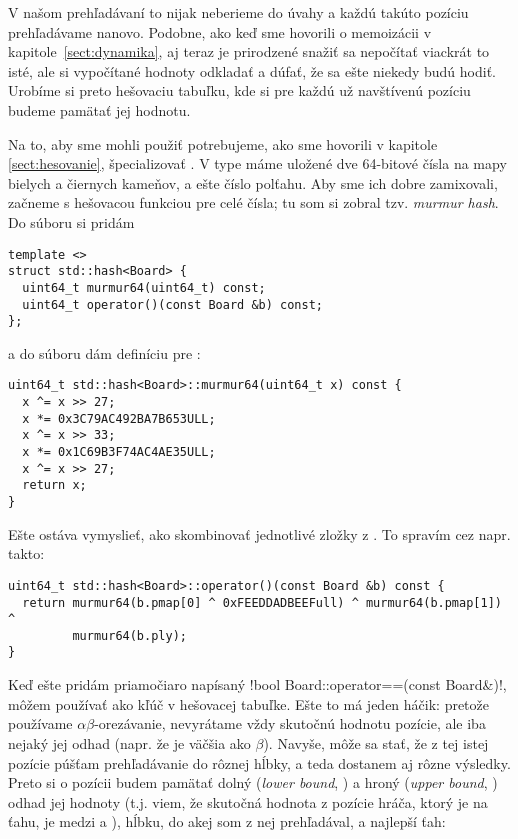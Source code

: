 V našom prehľadávaní to nijak neberieme do úvahy a každú
takúto pozíciu prehľadávame nanovo.
Podobne, ako keď sme hovorili o memoizácii v kapitole~\ref{sect:dynamika}, aj teraz je prirodzené
snažiť sa nepočítať viackrát to isté, ale si vypočítané hodnoty odkladať a dúfať, že sa ešte niekedy budú hodiť.
Urobíme si preto hešovaciu tabuľku, kde si pre každú už navštívenú pozíciu budeme pamätať jej hodnotu.

Na to, aby sme mohli použiť  potrebujeme, ako sme hovorili v kapitole \ref{sect:hesovanie}, špecializovať
. V type  máme uložené dve 64-bitové čísla na mapy bielych a čiernych kameňov, a ešte číslo polťahu.
Aby sme ich dobre zamixovali, začneme s hešovacou funkciou pre celé čísla; tu som si zobral tzv. {\em murmur hash}. Do súboru
 si pridám\\

\begin{lstlisting}
template <>
struct std::hash<Board> {
  uint64_t murmur64(uint64_t) const;
  uint64_t operator()(const Board &b) const;
};
\end{lstlisting}

a do súboru  dám definíciu pre :\\

\begin{lstlisting}
uint64_t std::hash<Board>::murmur64(uint64_t x) const {
  x ^= x >> 27;
  x *= 0x3C79AC492BA7B653ULL;
  x ^= x >> 33;
  x *= 0x1C69B3F74AC4AE35ULL;
  x ^= x >> 27;
  return x;
}
\end{lstlisting}

Ešte ostáva vymyslieť, ako skombinovať jednotlivé zložky z . To spravím cez  napr. takto:

\begin{lstlisting}
uint64_t std::hash<Board>::operator()(const Board &b) const {
  return murmur64(b.pmap[0] ^ 0xFEEDDADBEEFull) ^ murmur64(b.pmap[1]) ^
         murmur64(b.ply);
}
\end{lstlisting}

Keď ešte pridám priamočiaro napísaný \prg!bool Board::operator==(const Board&)!, môžem  používať ako kľúč v hešovacej tabuľke. 
Ešte to má jeden háčik: pretože používame $\alpha\beta$-orezávanie, nevyrátame vždy skutočnú hodnotu pozície, ale iba nejaký jej odhad (napr.
že je väčšia ako $\beta$). Navyše, môže sa stať, že z tej istej pozície púšťam prehľadávanie do rôznej hĺbky, a teda dostanem aj rôzne výsledky.
Preto si o pozícii budem pamätať dolný ({\em lower bound}, ) a hroný ({\em upper bound}, ) odhad jej hodnoty (t.j. viem, že skutočná
hodnota z pozície hráča, ktorý je na ťahu, je medzi  a ), hĺbku, do akej som z nej prehľadával, a najlepší ťah:\\


